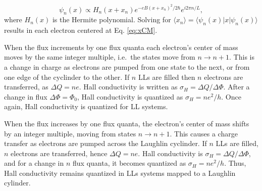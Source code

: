 \begin{equation}
  \psi_n(x) \propto H_n (x+x_n) e^{-eB(x+x_n)^2 / 2\hbar} e^{i2\pi n/L},
\end{equation}
where $H_n(x)$ is the Hermite polynomial.
Solving for $\langle x_n \rangle = \langle \psi_n(x) | x | \psi_n(x) \rangle$ results in each electron centered at Eq. \eqref{eq:xCM}.

When the flux increments by one flux quanta each electron's center of mass moves by the same integer multiple, i.e.\ the states move from $n\rightarrow n+1$.
This is a change in charge as electrons are pumped from one state to the next, or from one edge of the cyclinder to the other.
If $n$ LLs are filled then $n$ electrons are transferred, as $\Delta Q = ne$.
Hall conductivity is written as $\sigma_H = \Delta Q / \Delta \Phi$.
After a change in flux $\Delta \Phi = \Phi_0$, Hall conductivity is quantized as $\sigma_H = ne^2 / h$.
Once again, Hall conductivity is quantized for LL systems.

When the flux increases by one flux quanta, the electron's center of mass shifts by an integer multiple, moving from states $n \rightarrow n+1$.
This causes a charge transfer as electrons are pumped across the Laughlin cyclinder.
If $n$ LLs are filled, $n$ electrons are transferred, hence $\Delta Q = ne$.
Hall conductivity is $\sigma_H = \Delta Q/ \Delta \Phi$, and for a change in $n$ flux quanta, it becomes quantized as $\sigma_H = ne^2/h$.
Thus, Hall conductivity remains quantized in LLs systems mapped to a Laughlin cylinder.

